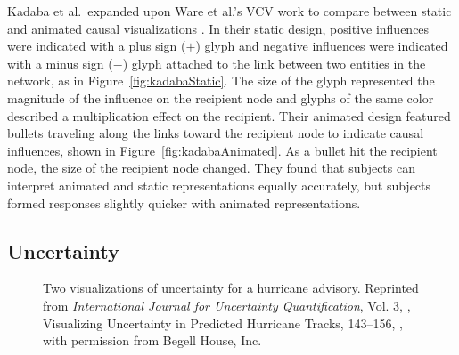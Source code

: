 Kadaba et al.\ expanded upon Ware et al.'s VCV work to compare between static and animated causal visualizations \citeyearpar{kadaba2007}.  In their static design, positive influences were indicated with a plus sign ($+$) glyph and negative influences were indicated with a minus sign ($-$) glyph attached to the link between two entities in the network, as in Figure~\ref{fig:kadabaStatic}.  The size of the glyph represented the magnitude of the influence on the recipient node and glyphs of the same color described a multiplication effect on the recipient.   Their animated design featured bullets traveling along the links toward the recipient node to indicate causal influences, shown in Figure~\ref{fig:kadabaAnimated}.  As a bullet hit the recipient node, the size of the recipient node changed.  They found that subjects can interpret animated and static representations equally accurately, but subjects formed responses slightly quicker with animated representations.

\subsection{Uncertainty}

\begin{figure}
\centering



\caption[Two visualizations of uncertainty for a hurricane advisory]{Two visualizations of uncertainty for a hurricane advisory.  Reprinted from \textit{International Journal for Uncertainty Quantification}, Vol. 3, \citeauthor{cox2013}, Visualizing Uncertainty in Predicted Hurricane Tracks, 143--156, \textcopyright \citeyear{cox2013}, with permission from Begell House, Inc.}

	\label{fig:uncertaintyAlternatives}
\end{figure}

